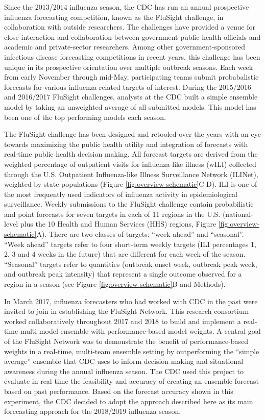 \documentclass{article}\usepackage[]{graphicx}\usepackage[]{color}
\begin{document}
Since the 2013/2014 influenza season, the CDC has run an annual prospective influenza forecasting competition, known as the FluSight challenge, in collaboration with outside researchers. 
The challenges have provided a venue for close interaction and collaboration between government public health officials and academic and private-sector researchers. 
Among other government-sponsored infectious disease forecasting competitions in recent years,\cite{DARPA2015,NOAA} this challenge has been unique in its prospective orientation over multiple outbreak seasons.
Each week from early November through mid-May, participating teams submit probabalistic forecasts for various influenza-related targets of interest.
During the 2015/2016 and 2016/2017 FluSight challenges, analysts at the CDC built a simple ensemble model by taking an unweighted average of all submitted models. 
This model has been one of the top performing models each season.\cite{McGowan2018}

The FluSight challenge has been designed and retooled over the years with an eye towards maximizing the public health utility and integration of forecasts with real-time public health decision making.
All forecast targets are derived from the weighted percentage of outpatient visits for influenza-like illness (wILI) collected through the U.S. Outpatient Influenza-like Illness Surveillance Network (ILINet), weighted by state populations (Figure \ref{fig:overview-schematic}C-D).
ILI is one of the most frequently used indicators of influenza activity in epidemiological surveillance. 
Weekly submissions to the FluSight challenge contain probabilistic and point forecasts for seven targets in each of 11 regions in the U.S. (national-level plus the 10 Health and Human Services (HHS) regions, Figure \ref{fig:overview-schematic}A).
There are two classes of targets: ``week-ahead'' and ``seasonal''.
``Week ahead'' targets refer to four short-term weekly targets (ILI percentages 1, 2, 3 and 4 weeks in the future) that are different for each week of the season.
``Seasonal'' targets refer to quantities (outbreak onset week, outbreak peak week, and outbreak peak intensity) that represent a single outcome observed for a region in a season (see Figure \ref{fig:overview-schematic}B and Methods). 

In March 2017, influenza forecasters who had worked with CDC in the past were invited to join in establishing the FluSight Network.
This research consortium worked collaboratively throughout 2017 and 2018 to build and implement a real-time multi-model ensemble with performance-based model weights.
A central goal of the FluSight Network was to demonstrate the benefit of performance-based weights in a real-time, multi-team ensemble setting by outperforming the ``simple average'' ensemble that CDC uses to inform decision making and situational awareness during the annual influenza season. 
The CDC used this project to evaluate in real-time the feasibility and accuracy of creating an ensemble forecast based on past performance. 
Based on the forecast accuracy shown in this experiment, the CDC decided to adopt the approach described here as its main forecasting approach for the 2018/2019 influenza season. 
\end{document}
